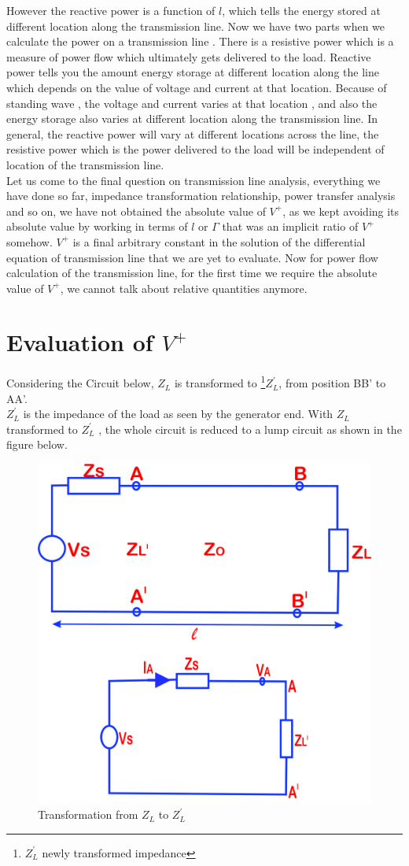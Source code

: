 However the reactive power is a function of $l$, which tells the energy stored at different location along the transmission line. Now we have two parts when we calculate the power on a transmission line . There is a resistive power which is a measure of power flow which ultimately gets delivered to the load. Reactive power tells you the amount energy storage at different location along the line which depends on the value of voltage and current at that location. Because of standing wave , the voltage and current varies at that location , and also the energy storage also varies at different location along the transmission line. In general, the reactive power will vary at different locations across the line, the resistive power which is the power delivered to the load will be independent of location of the transmission line.\\
Let us come to the final question on transmission line analysis, everything we have done so far, impedance transformation relationship, power transfer analysis and so on, we have not obtained the absolute value of $V^+$, as we kept avoiding its absolute value by working in terms of $l$ or $\Gamma$ that was an implicit ratio of $V^+$ somehow. $V^+$ is a final arbitrary constant in the solution of the differential equation of transmission line that we are yet to evaluate. Now for power flow calculation of the transmission line, for the first time we require the absolute value of $V^+$, we cannot talk about relative quantities anymore.

\section{Evaluation of \textbf{$ V ^ {+} $} } 
Considering the Circuit below, $Z_L$ is transformed to \footnote{$Z^{'}_L$ newly transformed impedance}$Z^{'}_L$, from position BB' to AA'.\\
$Z^{'}_L$ is the impedance of the load as seen by the generator end. With $Z_L$ transformed to $Z^{'}_L$ , the whole circuit is reduced to a lump circuit as shown in the figure below.
\begin{figure}[h]
\centering
\includegraphics[width=0.7\linewidth]{./graphics/qwerrtt fixed}
\caption{Transformation from $Z_L$ to $Z_{L}^'$}
\label{fig:qwerrtt}
\end{figure}

